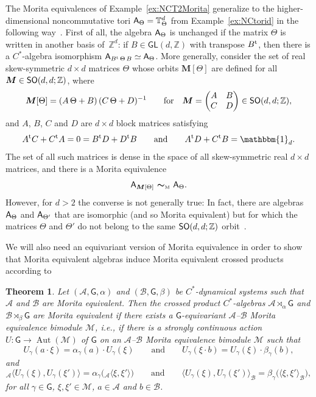 \documentclass[10pt,a4paper]{amsart}
\numberwithin{equation}{section}
\newcommand{\Z}{\zed}
\newcommand{\mbf}[1]{{\boldsymbol {#1} }}
\def\A{{\sf A}}
\newcommand{\unit}{\mathbbm{1}} 			%
\newcommand{\sfG}{\mathsf{G}}
\newcommand{\sfGL}{\mathsf{GL}}
\newcommand{\Aut}{\operatorname{Aut}}
\newcommand{\zed}{{\mathbb Z}} %
\newcommand{\torus}{{\mathbb T}} %
\def\alg{{\mathcal A}}
\def\balg{{\mathcal B}}
\def\Mcal{{\mathcal M}}
\newtheorem{Theorem}{Theorem}[section]
\begin{document}
\begin{Example}
\label{ex:NCTdMorita}
The Morita equivalences of Example~\ref{ex:NCT2Morita} generalize to
the higher-dimensional noncommutative tori $\A_\Theta=\torus^d_\Theta$
from Example~\ref{ex:NCtorid} in the following
way~\cite{Rieffel1998}. First of all, the algebra $\A_\Theta$ is
unchanged if the matrix $\Theta$ is written in another basis of~$\Z^d$: if $B\in\sfGL(d,\Z)$ with transpose $B^{\rm t}$, then there is
a $C^*$-algebra isomorphism
$\A_{B^{\rm t}\,\Theta\,B}\simeq\A_\Theta$. More generally, consider the set of real
skew-symmetric $d{\times}d$ matrices $\Theta$ whose orbits
$\mbf M[\Theta]$ are defined for all $\mbf M\in{\sf SO}(d,d;\Z)$, where
\[
\mbf M[\Theta] = (A\,\Theta+B)\,(C\,\Theta+D)^{-1} \qquad \mbox{for} \quad
\mbf M=\left(\begin{matrix} A & B \\ C & D \end{matrix}\right) \in
{\sf SO}(d,d;\Z) ,
\]
and $A$, $B$, $C$ and $D$ are $d{\times}d$ block matrices satisfying
\[
A^{\rm t} C+C^{\rm t} A = 0 = B^{\rm t} D+D^{\rm t} B \qquad
\mbox{and} \qquad A^{\rm t} D+C^{\rm t} B=\unit_d .
\]
The set of all such matrices is dense in the space of all
skew-symmetric real $d{\times}d$ matrices, and there is a Morita
equivalence
\[
\A_{\mbf M[\Theta]} \ \mbf\sim_{\text{\tiny M}} \ \A_\Theta .
\]
However, for $d>2$ the converse is not generally true: In fact, there
are algebras $\A_\Theta$ and $\A_{\Theta'}$ that are isomorphic (and
so Morita equivalent) but for which the matrices $\Theta$ and
$\Theta'$ do not belong to the same ${\sf SO}(d,d;\Z)$
orbit~\cite{Rieffel1998}.
\end{Example}

We will also need an equivariant version of Morita equivalence in
order to show that Morita equivalent algebras induce Morita
equivalent crossed products according
to~\cite[Section~5.4]{Echterhoff2017}
\begin{Theorem}\label{equivMorita}
Let $(\alg,\sfG, \alpha)$ and $(\balg,\sfG, \beta)$ be
$C^*$-dynamical systems such that
$\alg$ and $\balg$ are Morita equivalent. Then the crossed product $C^*$-algebras
$\alg\rtimes_\alpha \sfG$ and $\balg\rtimes_\beta \sfG$ are Morita equivalent if
there exists a $\sfG$-equivariant $\alg$--$\balg$ Morita equivalence bimodule $\Mcal$,
i.e., if there is a strongly continuous action $U\colon \sfG\to \Aut(\Mcal)$ of $\sfG$ on an
$\alg$--$\balg$ Morita equivalence bimodule $\Mcal$ such that
\[
U_\gamma(a\cdot \xi)=\alpha_\gamma(a)\cdot
U_\gamma(\xi) \qquad \mbox{and} \qquad U_\gamma(\xi\cdot b)=U_\gamma(\xi)\cdot
\beta_\gamma(b) ,
\]
and
\[
{}_{\alg}\langle U_\gamma(\xi),U_\gamma(\xi')\rangle=\alpha_\gamma\big({}_\alg\langle
\xi,\xi'\rangle\big) \qquad \mbox{and} \qquad \langle
U_\gamma(\xi),U_\gamma(\xi')\rangle_\balg =\beta_\gamma\big(\langle
\xi,\xi'\rangle_\balg\big) ,
\]
for
all $\gamma\in \sfG$, $\xi,\xi'\in \Mcal$, $a\in \alg$ and $b\in \balg$.
\end{Theorem}
\end{document}

